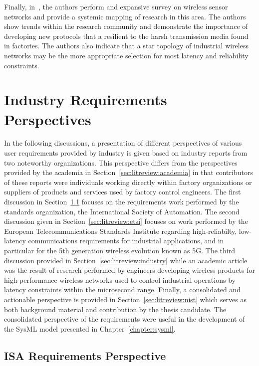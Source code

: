 Finally, in~\cite{QUEIROZ201796}, the authors perform and expansive survey on wireless sensor networks and provide a systemic mapping of research in this area.  The authors show trends within the research community and demonstrate the importance of developing new protocols that a resilient to the harsh transmission media found in factories.  The authors also indicate that a star topology of industrial wireless networks may be the more appropriate selection for most latency and reliability constraints.


\section{Industry Requirements Perspectives}

In the following discussions, a presentation of different perspectives of various user requirements provided by industry is given based on industry reports from two noteworthy organizations.  This perspective differs from the perspectives provided by the academia in Section~\ref{sec:litreview:academia} in that contributors of these reports were individuals working directly within factory organizations or suppliers of products and services used by factory control engineers.  The first discussion in Section~\ref{sec:litreview:isa} focuses on the requirements work performed by the standards organization, the International Society of Automation.  The second discussion given in Section~\ref{sec:litreview:etsi} focuses on work performed by the European Telecommunications Standards Institute regarding high-reliabilty, low-latency communications requirements for industrial applications, and in particular for the 5th generation wireless evolution known as 5G.  The third discussion provided in Section~\ref{sec:litreview:industry} while an academic article was the result of research performed by engineers developing wireless products for high-performance wireless networks used to control industrial operations by latency constraints within the microsecond range.  Finally, a consolidated and actionable perspective is provided in Section~\ref{sec:litreview:nist} which serves as both background material and contribution by the thesis candidate.  The consolidated perspective of the requirements were useful in the development of the SysML model presented in Chapter~\ref{chapter:sysml}.

\subsection{ISA Requirements Perspective}\label{sec:litreview:isa}

